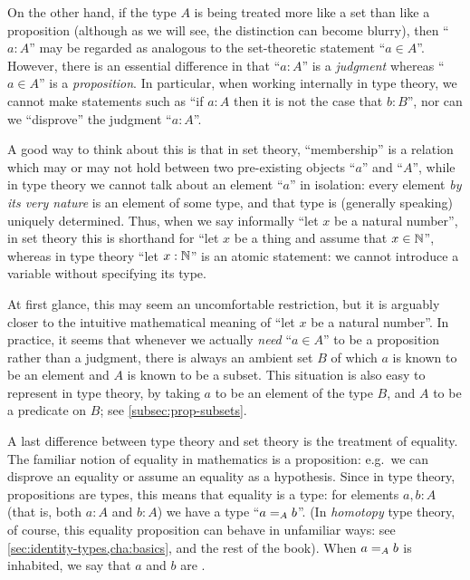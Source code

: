 On the other hand, if the type $A$ is being treated more like a set than like a proposition (although as we will see, the distinction can become blurry), then ``$a:A$'' may be regarded as analogous to the set-theoretic statement ``$a\in A$''.
However, there is an essential difference in that ``$a:A$'' is a \emph{judgment} whereas ``$a\in A$'' is a \emph{proposition}.
In particular, when working internally in type theory, we cannot make statements such as ``if $a:A$ then it is not the case that $b:B$'', nor can we ``disprove'' the judgment ``$a:A$''.

A good way to think about this is that in set theory, ``membership'' is a relation which may or may not hold between two pre-existing objects ``$a$'' and ``$A$'', while in type theory we cannot talk about an element ``$a$'' in isolation: every element \emph{by its very nature} is an element of some type, and that type is (generally speaking) uniquely determined.
Thus, when we say informally ``let $x$ be a natural number'', in set theory this is shorthand for ``let $x$ be a thing and assume that $x\in\nat$'', whereas in type theory ``let $x:\nat$'' is an atomic statement: we cannot introduce a variable without specifying its type.

At first glance, this may seem an uncomfortable restriction, but it is arguably closer to the intuitive mathematical meaning of ``let $x$ be a natural number''.
In practice, it seems that whenever we actually \emph{need} ``$a\in A$'' to be a proposition rather than a judgment, there is always an ambient set $B$ of which $a$ is known to be an element and $A$ is known to be a subset.
This situation is also easy to represent in type theory, by taking $a$ to be an element of the type $B$, and $A$ to be a predicate on $B$; see \autoref{subsec:prop-subsets}.

A last difference between type theory and set theory is the treatment of equality.
The familiar notion of equality in mathematics is a proposition: e.g.\ we can disprove an equality or assume an equality as a hypothesis.
Since in type theory, propositions are types, this means that equality is a type: for elements $a,b:A$ (that is, both $a:A$ and $b:A$) we have a type ``$\id[A]ab$''.
(In \emph{homotopy} type theory, of course, this equality proposition can behave in unfamiliar ways: see \autoref{sec:identity-types,cha:basics}, and the rest of the book).
When $\id[A]ab$ is inhabited, we say that $a$ and $b$ are .
%
%

